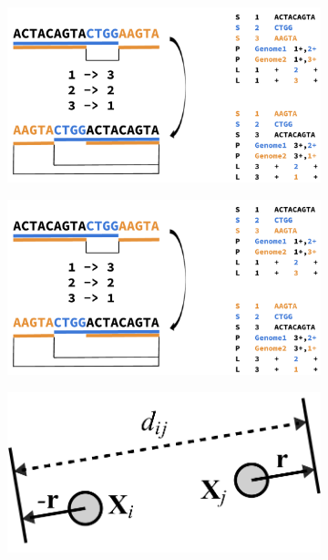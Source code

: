 \begin{figure}[!htb]
	\centering
		\begin{subfigure}[t]{0.4\textwidth}
			\centering
			\caption{}
			\includegraphics[width=\linewidth]{fig/algorithm/TODO_1D_metrics_explained.pdf}
			\label{fig:metrics_explained}
		\end{subfigure}
		\begin{subfigure}[t]{0.4\textwidth}
		\centering
		\caption{}
		\includegraphics[width=\linewidth]{fig/algorithm/TODO_1D_sorting_explained.pdf}
		\label{fig:sorting_explained}
		\end{subfigure}
		\begin{subfigure}[t]{0.4\textwidth}
			\centering
			\caption{}
			\includegraphics[width=\linewidth]{fig/algorithm/TODO_pg_sgd_update_sketch.png}

\end{subfigure}
\end{figure}
